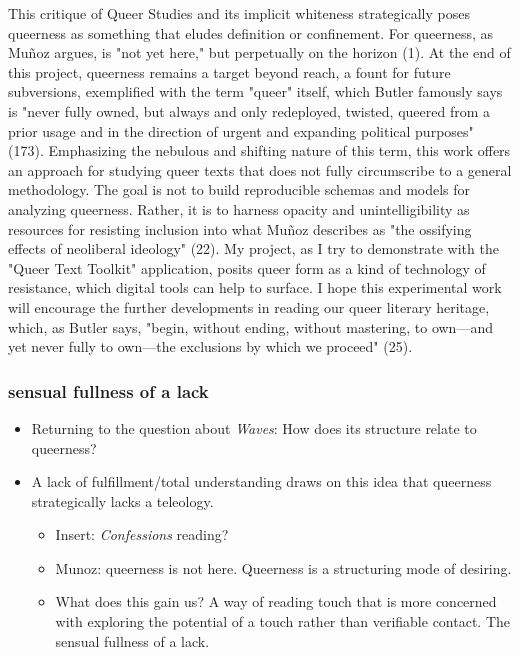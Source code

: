 \documentclass[11pt]{article}
\begin{document}
This critique of Queer Studies and its implicit whiteness
strategically poses queerness as something that eludes definition or
confinement. For queerness, as Muñoz argues, is "not yet here," but
perpetually on the horizon (1). At the end of this project, queerness
remains a target beyond reach, a fount for future subversions,
exemplified with the term "queer" itself, which Butler famously says
is "never fully owned, but always and only redeployed, twisted,
queered from a prior usage and in the direction of urgent and
expanding political purposes" (173). Emphasizing the nebulous and
shifting nature of this term, this work offers an approach for
studying queer texts that does not fully circumscribe to a general
methodology. The goal is not to build reproducible schemas and models
for analyzing queerness. Rather, it is to harness opacity and
unintelligibility as resources for resisting inclusion into what Muñoz
describes as "the ossifying effects of neoliberal ideology" (22). My
project, as I try to demonstrate with the "Queer Text Toolkit"
application, posits queer form as a kind of technology of resistance,
which digital tools can help to surface. I hope this experimental work
will encourage the further developments in reading our queer literary
heritage, which, as Butler says, "begin, without ending, without
mastering, to own—and yet never fully to own—the exclusions by which
we proceed" (25).

\subsubsection{sensual fullness of a lack}
\label{sec:orgb6ea6f4}
\begin{itemize}
\item Returning to the question about \emph{Waves}: How does its structure
relate to queerness?
\item A lack of fulfillment/total understanding draws on this idea that
queerness strategically lacks a teleology.
\begin{itemize}
\item Insert: \emph{Confessions} reading?
\item Munoz: queerness is not here. Queerness is a structuring mode of
desiring.
\item What does this gain us? A way of reading touch that is more
concerned with exploring the potential of a touch rather than
verifiable contact. The sensual fullness of a lack.
\end{itemize}
\end{itemize}
\end{document}
